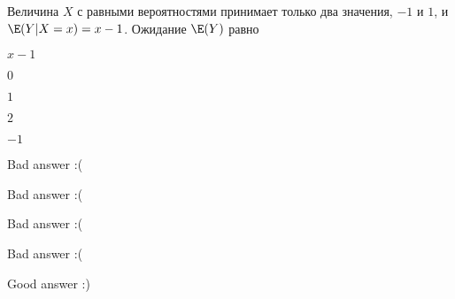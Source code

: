 
\begin{question}
Величина \(X\) с равными вероятностями принимает только два значения,
\(-1\) и \(1\), и \(\E(Y|X=x)=x-1\). Ожидание \(\E(Y)\) равно
\begin{answerlist}
  \item \(x-1\)
  \item \(0\)
  \item \(1\)
  \item \(2\)
  \item \(-1\)
\end{answerlist}
\end{question}

\begin{solution}
\begin{answerlist}
  \item Bad answer :(
  \item Bad answer :(
  \item Bad answer :(
  \item Bad answer :(
  \item Good answer :)
\end{answerlist}
\end{solution}

